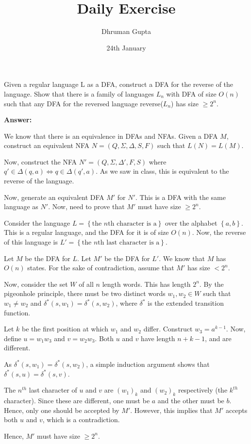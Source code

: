 \documentclass[11pt]{article}
\title{Daily Exercise}
\author{Dhruman Gupta}
\date{24th January}
\begin{document}

Given a regular language L as a DFA, construct a DFA for the reverse of the language. Show that there is a family of languages $L_n$ with DFA of size $O(n)$ such that any DFA for the reversed language reverse($L_n$) has size $\geq 2^n$.

\textbf{Answer:}

We know that there is an equivalence in DFAs and NFAs. Given a DFA $M$, construct an equivalent NFA $N = \left( Q, \Sigma, \Delta, S, F \right)$ such that $L(N) = L(M)$.

Now, construct the NFA $N' = \left( Q, \Sigma, \Delta', F, S \right)$ where $q' \in \Delta(q, a) \iff q \in \Delta(q', a)$. As we saw in class, this is equivalent to the reverse of the language.

Now, generate an equivalent DFA $M'$ for $N'$. This is a DFA with the same language as $N'$. Now, need to prove that $M'$ must have size $\geq 2^n$.

Consider the language $L = \left\{ \text{the $n$th character is a} \right\}$ over the alphabet $\left\{ a, b \right\}$. This is a regular language, and the DFA for it is of size $O(n)$. Now, the reverse of this language is $L' = \left\{ \text{the $n$th last character is a} \right\}$.

Let $M$ be the DFA for $L$. Let $M'$ be the DFA for $L'$. We know that $M$ has $O(n)$ states. For the sake of contradiction, assume that $M'$ has size $< 2^n$. 

Now, consider the set $W$ of all $n$ length words. This has length $2^n$. By the pigeonhole principle, there must be two distinct words $w_1, w_2 \in W$ such that $w_1 \neq w_2$ and $\delta^*(s, w_1) = \delta^*(s, w_2)$, where $\delta^*$ is the extended transition function.

Let $k$ be the first position at which $w_1$ and $w_2$ differ. Construct $w_3 = a^{k-1}$. Now, define $u = w_1w_3$ and $v = w_2w_3$. Both $u$ and $v$ have length $n + k - 1$, and are different.

As $\delta^*(s, w_1) = \delta^*(s, w_2)$, a simple induction argument shows that $\delta^*(s, u) = \delta^*(s, v)$.

The $n^{th}$ last character of $u$ and $v$ are $(w_1)_k$ and $(w_2)_k$ respectively (the $k^{th}$ character). Since these are different, one must be $a$ and the other must be $b$. Hence, only one should be accepted by $M'$. However, this implies that $M'$ accepts both $u$ and $v$, which is a contradiction.

Hence, $M'$ must have size $\geq 2^n$.
\end{document}
